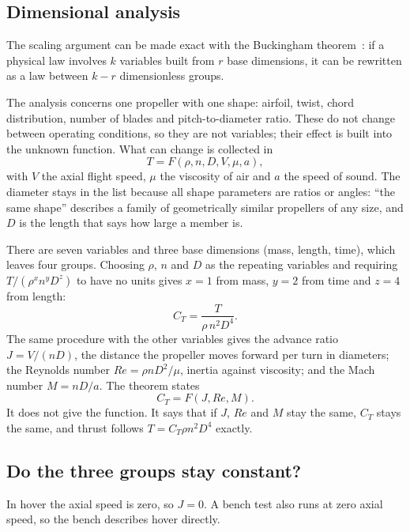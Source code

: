 \subsection{Dimensional analysis}

The scaling argument can be made exact with the Buckingham theorem~\citep{buckingham}: if a physical law involves $k$ variables built from $r$ base dimensions, it can be rewritten as a law between $k-r$ dimensionless groups.

The analysis concerns one propeller with one shape: airfoil, twist, chord distribution, number of blades and pitch-to-diameter ratio. These do not change between operating conditions, so they are not variables; their effect is built into the unknown function. What can change is collected in
\begin{equation}
T = F(\rho, n, D, V, \mu, a),
\end{equation}
with $V$ the axial flight speed, $\mu$ the viscosity of air and $a$ the speed of sound. The diameter stays in the list because all shape parameters are ratios or angles: ``the same shape'' describes a family of geometrically similar propellers of any size, and $D$ is the length that says how large a member is.

There are seven variables and three base dimensions (mass, length, time), which leaves four groups. Choosing $\rho$, $n$ and $D$ as the repeating variables and requiring $T/(\rho^x n^y D^z)$ to have no units gives $x = 1$ from mass, $y = 2$ from time and $z = 4$ from length:
\begin{equation}
C_T = \frac{T}{\rho\, n^2 D^4}.
\end{equation}
The same procedure with the other variables gives the advance ratio $J = V/(nD)$, the distance the propeller moves forward per turn in diameters; the Reynolds number $Re = \rho n D^2/\mu$, inertia against viscosity; and the Mach number $M = nD/a$. The theorem states
\begin{equation}
C_T = F(J, Re, M).
\end{equation}
It does not give the function. It says that if $J$, $Re$ and $M$ stay the same, $C_T$ stays the same, and thrust follows $T = C_T \rho n^2 D^4$ exactly.

\subsection{Do the three groups stay constant?}

In hover the axial speed is zero, so $J = 0$. A bench test also runs at zero axial speed, so the bench describes hover directly.

